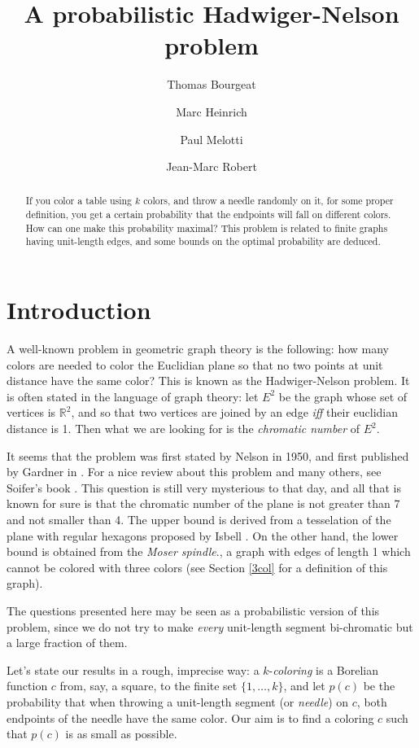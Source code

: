 \documentclass[a4paper,11pt]{article}
\title{A probabilistic Hadwiger-Nelson problem}
\author[1]{Thomas Bourgeat}
\author[1]{Marc Heinrich}
\author[1]{Paul Melotti}
\affil[1]{Computer science department,\authorcr
\'Ecole Normale Sup\'erieure, Paris, France\authorcr
		  \texttt{\{surname\}.\{name\}@ens.fr}
}
\author[2]{Jean-Marc Robert}
\affil[2]{Software engineering and IT department,\authorcr
\'Ecole de Technologie Sup\'erieure, Montr\'eal, Canada\authorcr
		  \texttt{jean-marc.robert@etsmtl.ca}
}
\theoremstyle{definition}
\theoremstyle{remark}
\newcommand{\R}{\mathbb{R}}
\begin{document}
\maketitle

\begin{abstract} If you color a table using $k$ colors, and throw a needle
randomly on it, for some proper definition, you get a certain probability that the endpoints will fall on 
different colors. How can one make this probability maximal?
This problem is related to finite graphs having unit-length edges, and 
some bounds on the optimal probability are deduced.\end{abstract}

\section{Introduction}

A well-known problem in geometric graph theory is the following: how many colors
are needed to color the Euclidian plane so that no two points at unit distance have the 
same color? This is known as the Hadwiger-Nelson problem. It is often stated in 
the language of graph theory: let $E^2$ be the graph whose set of vertices is $\R^2$,
and so that two vertices are joined by an edge \textit{iff} their euclidian distance
is 1. Then what we are looking for is the \textit{chromatic number} of $E^2$.

It seems that the problem was first stated by Nelson in 1950, and first published by 
Gardner in \cite{gardner}.
For a nice review about this problem and many others, see Soifer's book
\cite{soifer}. This question is still very mysterious to that day, and all that 
is known for sure is that the chromatic number of the plane is not greater than
7 and not smaller than 4. The upper bound is derived from a tesselation of the 
plane with regular hexagons proposed by Isbell \cite{soifer}. On the other hand,
the lower bound is obtained from the \textit{Moser spindle}.\cite{moser}, a graph with edges
of length 1 which cannot be colored with three colors (see Section \ref{3col} for
a definition of this graph).

The questions presented here may be seen as a probabilistic version of this 
problem, since we do not try to make \textit{every} unit-length segment 
bi-chromatic but a large fraction of them.

\medskip

Let's state our results in a rough, imprecise way: a $k$-\textit{coloring} is a Borelian 
function $c$ from, say, a square, to the finite set $\{1, \dots , k \}$, and let $p(c)$ be the probability that when throwing a unit-length
segment (or \textit{needle}) on $c$, both endpoints of the needle have the same color.
Our aim is to find a coloring $c$ such that $p(c)$ is as small as possible.
\end{document}
